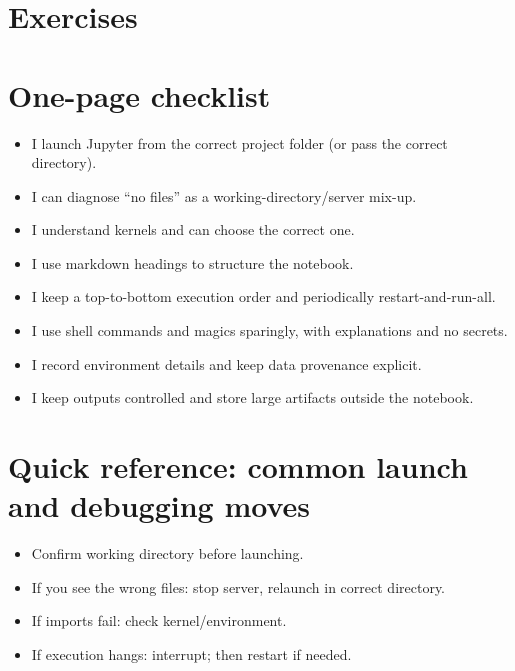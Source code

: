 \section{Exercises}

\section{One-page checklist}
\begin{itemize}
\item I launch Jupyter from the correct project folder (or pass the correct directory).
\item I can diagnose ``no files'' as a working-directory/server mix-up.
\item I understand kernels and can choose the correct one.
\item I use markdown headings to structure the notebook.
\item I keep a top-to-bottom execution order and periodically restart-and-run-all.
\item I use shell commands and magics sparingly, with explanations and no secrets.
\item I record environment details and keep data provenance explicit.
\item I keep outputs controlled and store large artifacts outside the notebook.
\end{itemize}

\section{Quick reference: common launch and debugging moves}
\begin{itemize}
\item Confirm working directory before launching.
\item If you see the wrong files: stop server, relaunch in correct directory.
\item If imports fail: check kernel/environment.
\item If execution hangs: interrupt; then restart if needed.
\end{itemize}

